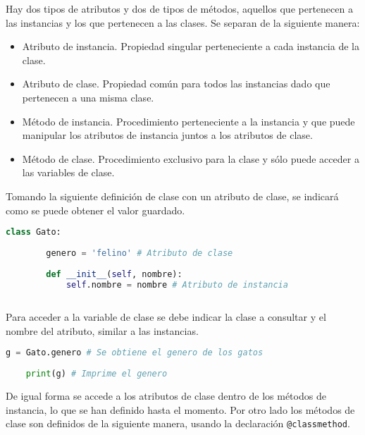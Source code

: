 \documentclass[11pt, letterpaper]{article}
\begin{document}
Hay dos tipos de atributos y dos de tipos de métodos, aquellos que pertenecen a las instancias y los que pertenecen a las clases. Se separan de la siguiente manera:

\begin{itemize}
    \item Atributo de instancia. Propiedad singular perteneciente a cada instancia de la clase.
    \item Atributo de clase. Propiedad común para todos las instancias dado que pertenecen a una misma clase.
    \item Método de instancia. Procedimiento perteneciente a la instancia y que puede manipular los atributos de instancia juntos a los atributos de clase.
    \item Método de clase. Procedimiento exclusivo para la clase y sólo puede acceder a las variables de clase.
\end{itemize}

Tomando la siguiente definición de clase con un atributo de clase, se indicará como se puede obtener el valor guardado.

\begin{center}
\begin{lstlisting}[language=Python,frame=single]
    class Gato:
    
        genero = 'felino' # Atributo de clase
        
        def __init__(self, nombre):
            self.nombre = nombre # Atributo de instancia
    
\end{lstlisting}
\end{center}

Para acceder a la variable de clase se debe indicar la clase a consultar y el nombre del atributo, similar a las instancias.

\begin{center}
\begin{lstlisting}[language=Python,frame=single]
    g = Gato.genero # Se obtiene el genero de los gatos
    
    print(g) # Imprime el genero
\end{lstlisting}
\end{center}

De igual forma se accede a los atributos de clase dentro de los métodos de instancia, lo que se han definido hasta el momento. Por otro lado los métodos de clase son definidos de la siguiente manera, usando la declaración \texttt{@classmethod}.
\end{document}

